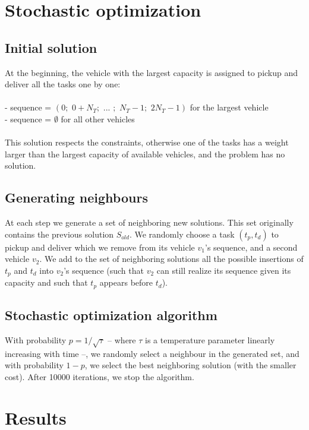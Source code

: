 \documentclass[11pt]{article}
\begin{document}
\section{Stochastic optimization}


\subsection{Initial solution}

At the beginning, the vehicle with the largest capacity is assigned to pickup and deliver all the tasks one by one:\\
\\
- sequence = $(0;\,\,0+N_T;\,\,...\,\,;\,\,N_T-1;\,\,2N_T-1)$ for the largest vehicle\\
- sequence = $\emptyset$ for all other vehicles\\
\\
This solution respects the constraints, otherwise one of the tasks has a weight larger than the largest capacity of available vehicles, and the problem has no solution.

\subsection{Generating neighbours}
At each step we generate a set of neighboring new solutions. This set originally contains the previous solution $S_\textit{old}$. We randomly choose a task $(t_p,t_d)$ to pickup and deliver which we remove from its vehicle $v_1$'s sequence, and a second vehicle $v_2$. We add to the set of neighboring solutions all the possible insertions of $t_p$ and $t_d$ into $v_2$'s sequence (such that $v_2$ can still realize its sequence given its capacity and such that $t_p$ appears before $t_d$). 

\subsection{Stochastic optimization algorithm}
With probability $p = 1/\sqrt{\tau}$ -- where $\tau$ is a temperature parameter linearly increasing with time --, we randomly select a neighbour in the generated set, and with probability $1-p$, we select the best neighboring solution (with the smaller cost). After 10000 iterations, we stop the algorithm.

\section{Results}
\end{document}
